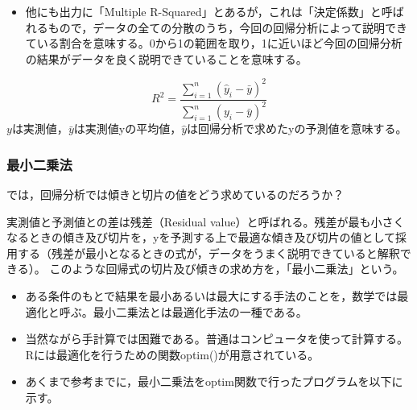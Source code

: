 \documentclass[]{article}
\providecommand{\tightlist}{%
  \setlength{\itemsep}{0pt}\setlength{\parskip}{0pt}}
\begin{document}
\begin{itemize}
\tightlist
\item
  他にも出力に「Multiple
  R-Squared」とあるが，これは「決定係数」と呼ばれるもので，データの全ての分散のうち，今回の回帰分析によって説明できている割合を意味する。0から1の範囲を取り，1に近いほど今回の回帰分析の結果がデータを良く説明できていることを意味する。
\end{itemize}

\[
R^2 = \frac{\sum^n_{i=1}(\hat{y}_i-\bar{y})^2}{\sum^n_{i=1}(y_i-\bar{y})^2}
\]
\(y\)は実測値，\(\bar{y}\)は実測値yの平均値，\(\hat{y}\)は回帰分析で求めたyの予測値を意味する。

\subsubsection{最小二乗法}

では，回帰分析では傾きと切片の値をどう求めているのだろうか？

実測値と予測値との差は残差（Residual
value）と呼ばれる。残差が最も小さくなるときの傾き及び切片を，yを予測する上で最適な傾き及び切片の値として採用する（残差が最小となるときの式が，データをうまく説明できていると解釈できる）。
このような回帰式の切片及び傾きの求め方を，「最小二乗法」という。

\begin{itemize}
\tightlist
\item
  ある条件のもとで結果を最小あるいは最大にする手法のことを，数学では最適化と呼ぶ。最小二乗法とは最適化手法の一種である。
\item
  当然ながら手計算では困難である。普通はコンピュータを使って計算する。Rには最適化を行うための関数optim()が用意されている。
\item
  あくまで参考までに，最小二乗法をoptim関数で行ったプログラムを以下に示す。
\end{itemize}
\end{document}
